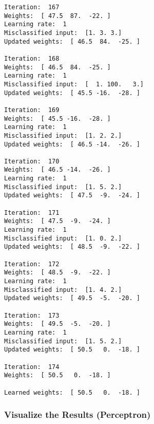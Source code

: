 \documentclass[11pt]{article}
\begin{document}
\begin{Verbatim}[commandchars=\\\{\}]
Iteration:  167
Weights:  [ 47.5  87.  -22. ]
Learning rate:  1
Misclassified input:  [1. 3. 3.]
Updated weights:  [ 46.5  84.  -25. ]

Iteration:  168
Weights:  [ 46.5  84.  -25. ]
Learning rate:  1
Misclassified input:  [  1. 100.   3.]
Updated weights:  [ 45.5 -16.  -28. ]

Iteration:  169
Weights:  [ 45.5 -16.  -28. ]
Learning rate:  1
Misclassified input:  [1. 2. 2.]
Updated weights:  [ 46.5 -14.  -26. ]

Iteration:  170
Weights:  [ 46.5 -14.  -26. ]
Learning rate:  1
Misclassified input:  [1. 5. 2.]
Updated weights:  [ 47.5  -9.  -24. ]

Iteration:  171
Weights:  [ 47.5  -9.  -24. ]
Learning rate:  1
Misclassified input:  [1. 0. 2.]
Updated weights:  [ 48.5  -9.  -22. ]

Iteration:  172
Weights:  [ 48.5  -9.  -22. ]
Learning rate:  1
Misclassified input:  [1. 4. 2.]
Updated weights:  [ 49.5  -5.  -20. ]

Iteration:  173
Weights:  [ 49.5  -5.  -20. ]
Learning rate:  1
Misclassified input:  [1. 5. 2.]
Updated weights:  [ 50.5   0.  -18. ]

Iteration:  174
Weights:  [ 50.5   0.  -18. ]

Learned weights:  [ 50.5   0.  -18. ]

    \end{Verbatim}

    \subsubsection{Visualize the Results
(Perceptron)}\label{visualize-the-results-perceptron}
\end{document}

